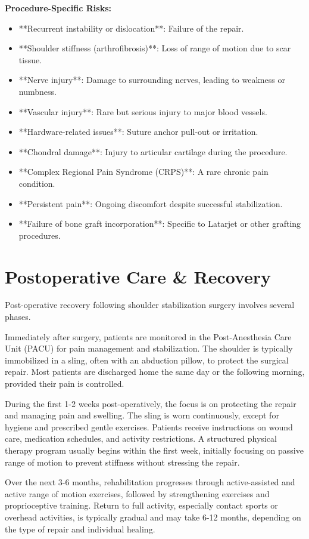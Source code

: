 \textbf{Procedure-Specific Risks:}
\begin{itemize}
  \item **Recurrent instability or dislocation**: Failure of the repair.
  \item **Shoulder stiffness (arthrofibrosis)**: Loss of range of motion due to scar tissue.
  \item **Nerve injury**: Damage to surrounding nerves, leading to weakness or numbness.
  \item **Vascular injury**: Rare but serious injury to major blood vessels.
  \item **Hardware-related issues**: Suture anchor pull-out or irritation.
  \item **Chondral damage**: Injury to articular cartilage during the procedure.
  \item **Complex Regional Pain Syndrome (CRPS)**: A rare chronic pain condition.
  \item **Persistent pain**: Ongoing discomfort despite successful stabilization.
  \item **Failure of bone graft incorporation**: Specific to Latarjet or other grafting procedures.
\end{itemize}

\section*{Postoperative Care \& Recovery}
Post-operative recovery following shoulder stabilization surgery involves several phases. 

Immediately after surgery, patients are monitored in the Post-Anesthesia Care Unit (PACU) for pain management and stabilization. The shoulder is typically immobilized in a sling, often with an abduction pillow, to protect the surgical repair. Most patients are discharged home the same day or the following morning, provided their pain is controlled.

During the first 1-2 weeks post-operatively, the focus is on protecting the repair and managing pain and swelling. The sling is worn continuously, except for hygiene and prescribed gentle exercises. Patients receive instructions on wound care, medication schedules, and activity restrictions. A structured physical therapy program usually begins within the first week, initially focusing on passive range of motion to prevent stiffness without stressing the repair. 

Over the next 3-6 months, rehabilitation progresses through active-assisted and active range of motion exercises, followed by strengthening exercises and proprioceptive training. Return to full activity, especially contact sports or overhead activities, is typically gradual and may take 6-12 months, depending on the type of repair and individual healing.

